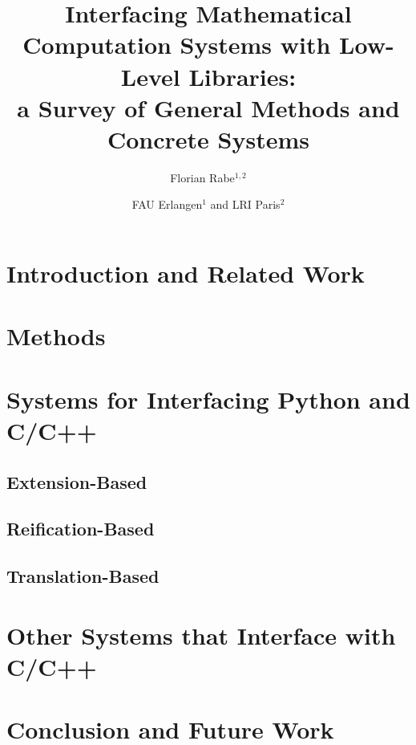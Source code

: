 \documentclass[a4paper]{article}
\begin{document}
\title{Interfacing Mathematical Computation Systems with Low-Level Libraries:\\ a Survey of General Methods and Concrete Systems}
\author{Florian Rabe$^{1,2}$}
\date{FAU Erlangen$^1$ and LRI Paris$^2$}

\maketitle

\begin{abstract} 
\end{abstract}

\section{Introduction and Related Work}\label{sec:intro}
  

\section{Methods}
  

\section{Systems for Interfacing Python and C/C++}

 \subsection{Extension-Based}
  
      
 \subsection{Reification-Based}
  
 
 \subsection{Translation-Based}
  

\section{Other Systems that Interface with C/C++}
  

\section{Conclusion and Future Work}\label{sec:conc} 
 



\end{document}
